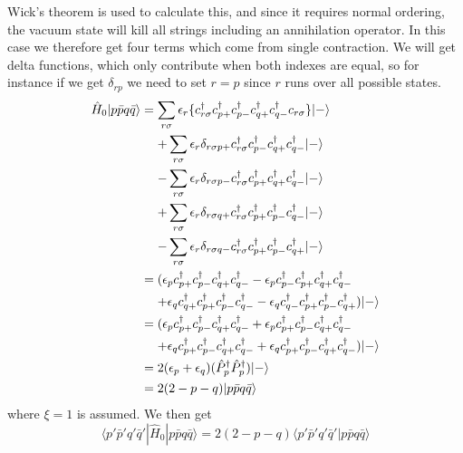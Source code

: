 \documentclass[norsk,a4paper,12pt]{article}
\begin{document}
Wick's theorem is used to calculate this, and since it requires normal ordering, the vacuum state will kill all strings including an annihilation operator. In this case we therefore get four terms which come from single contraction. We will get delta functions, which only contribute when both indexes are equal, so for instance if we get $\delta_{rp}$ we need to set $r=p$ since $r$ runs over all possible states.
\begin{align}
\hat{H}_0|p\bar{p}q\bar{q}\rangle 
&= \sum_{r\sigma}\epsilon_r\{c_{r\sigma}^{\dagger}c_{p+}^{\dagger}c_{p-}^{\dagger}c_{q+}^{\dagger}c_{q-}^{\dagger}c_{r\sigma}\}|-\rangle\notag\\
&\mathrel{\phantom{=}}+\sum_{r\sigma}\epsilon_r\delta_{r\sigma p+}c_{r\sigma}^{\dagger}c_{p-}^{\dagger}c_{q+}^{\dagger}c_{q-}^{\dagger}|-\rangle\notag\\
&\mathrel{\phantom{=}}-\sum_{r\sigma}\epsilon_r\delta_{r\sigma p-}c_{r\sigma}^{\dagger}c_{p+}^{\dagger}c_{q+}^{\dagger}c_{q-}^{\dagger}|-\rangle\notag\\
&\mathrel{\phantom{=}}+\sum_{r\sigma}\epsilon_r\delta_{r\sigma q+}c_{r\sigma}^{\dagger}c_{p+}^{\dagger}c_{p-}^{\dagger}c_{q-}^{\dagger}|-\rangle\notag\\
&\mathrel{\phantom{=}}-\sum_{r\sigma}\epsilon_r\delta_{r\sigma q-}c_{r\sigma}^{\dagger}c_{p+}^{\dagger}c_{p-}^{\dagger}c_{q+}^{\dagger}|-\rangle\\
&=(\epsilon_pc_{p+}^{\dagger}c_{p-}^{\dagger}c_{q+}^{\dagger}c_{q-}^{\dagger}-\epsilon_pc_{p-}^{\dagger}c_{p+}^{\dagger}c_{q+}^{\dagger}c_{q-}^{\dagger}\notag\\
&\mathrel{\phantom{=}}+\epsilon_qc_{q+}^{\dagger}c_{p+}^{\dagger}c_{p-}^{\dagger}c_{q-}^{\dagger}-\epsilon_qc_{q-}^{\dagger}c_{p+}^{\dagger}c_{p-}^{\dagger}c_{q+}^{\dagger})|-\rangle\\
&=(\epsilon_pc_{p+}^{\dagger}c_{p-}^{\dagger}c_{q+}^{\dagger}c_{q-}^{\dagger}+\epsilon_pc_{p+}^{\dagger}c_{p-}^{\dagger}c_{q+}^{\dagger}c_{q-}^{\dagger}\notag\\
&\mathrel{\phantom{=}}+\epsilon_qc_{p+}^{\dagger}c_{p-}^{\dagger}c_{q+}^{\dagger}c_{q-}^{\dagger}+\epsilon_qc_{p+}^{\dagger}c_{p-}^{\dagger}c_{q+}^{\dagger}c_{q-}^{\dagger})|-\rangle\\
&=2(\epsilon_p+\epsilon_q)(\hat{P}_p^{\dagger}\hat{P}_p^{\dagger})|-\rangle\\
&=2(2-p-q)|p\bar{p}q\bar{q}\rangle
\end{align} 
where $\xi=1$ is assumed. We then get
\begin{equation}
\langle p'\bar{p}'q'\bar{q}'|\hat{H}_0|p\bar{p}q\bar{q}\rangle=2(2-p-q)\langle p'\bar{p}'q'\bar{q}'|p\bar{p}q\bar{q}\rangle
\end{equation}
\end{document}
